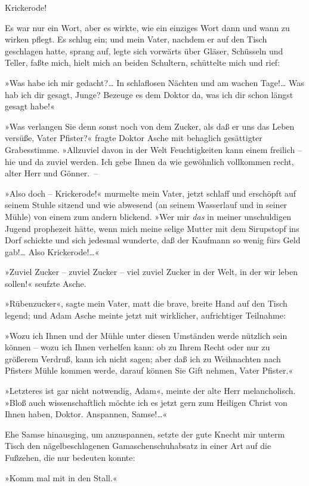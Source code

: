 Krickerode!

Es war nur ein Wort, aber es wirkte, wie ein einziges Wort dann und
wann zu wirken pflegt. Es schlug ein; und mein Vater, nachdem er
auf den Tisch geschlagen hatte, sprang auf, legte sich vorwärts
über Gläser, Schüsseln und Teller, faßte mich, hielt mich an beiden
Schultern, schüttelte mich und rief:

»Was habe ich mir gedacht?\ldots{} In schlaflosen Nächten und am wachen
Tage!\ldots{} Was hab ich dir gesagt, Junge? Bezeuge es dem Doktor da,
was ich dir schon längst gesagt habe!«

»Was verlangen Sie denn sonst noch von dem Zucker, als daß er uns
das Leben versüße, Vater Pfister?« fragte Doktor Asche mit
behaglich gesättigter Grabesstimme. »Allzuviel davon in der Welt
Feuchtigkeiten kann einem freilich – hie und da zuviel werden. Ich
gebe Ihnen da wie gewöhnlich vollkommen recht, alter Herr und
Gönner.~–

»Also doch – Krickerode!« murmelte mein Vater, jetzt schlaff und
erschöpft auf seinem Stuhle sitzend und wie abwesend (an seinem
Wasserlauf und in seiner Mühle) von einem zum andern blickend. »Wer
mir \emph{das} in meiner unschuldigen Jugend prophezeit hätte, wenn
mich meine selige Mutter mit dem Sirupstopf ins Dorf schickte und
sich jedesmal wunderte, daß der Kaufmann so wenig fürs Geld gab!\ldots{}
Also Krickerode!\ldots{}«

»Zuviel Zucker – zuviel Zucker – viel zuviel Zucker in der Welt, in
der wir leben sollen!« seufzte Asche.

»Rübenzucker«, sagte mein Vater, matt die brave, breite Hand auf
den Tisch legend; und Adam Asche meinte jetzt mit wirklicher,
aufrichtiger Teilnahme:

»Wozu ich Ihnen und der Mühle unter diesen Umständen werde nützlich
sein können – wozu ich Ihnen verhelfen kann: ob zu Ihrem Recht oder
nur zu größerem Verdruß, kann ich nicht sagen; aber daß ich zu
Weihnachten nach Pfisters Mühle kommen werde, darauf können Sie
Gift nehmen, Vater Pfister.«

»Letzteres ist gar nicht notwendig, Adam«, meinte der alte Herr
melancholisch. »Bloß auch wissenschaftlich möchte ich es jetzt gern
zum Heiligen Christ von Ihnen haben, Doktor. Anspannen, Samse!\ldots{}«

Ehe Samse hinausging, um anzuspannen, setzte der gute Knecht mir
unterm Tisch den nägelbeschlagenen Gamaschenschuhabsatz in einer
Art auf die Fußzehen, die nur bedeuten konnte:

»Komm mal mit in den Stall.«

